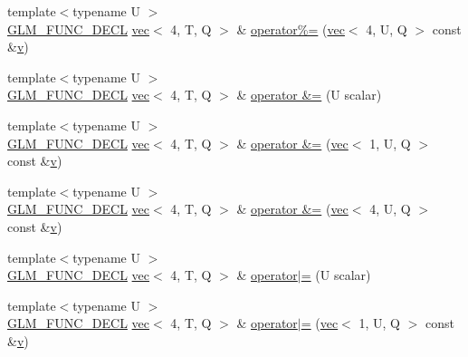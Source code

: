 \begin{DoxyCompactItemize}
\item 
{\footnotesize template$<$typename U $>$ }\\\hyperlink{setup_8hpp_ab2d052de21a70539923e9bcbf6e83a51}{G\+L\+M\+\_\+\+F\+U\+N\+C\+\_\+\+D\+E\+CL} \hyperlink{structglm_1_1vec}{vec}$<$ 4, T, Q $>$ \& \hyperlink{structglm_1_1vec_3_014_00_01_t_00_01_q_01_4_a10da98a89881a5135b526ceaa75c6f13}{operator\%=} (\hyperlink{structglm_1_1vec}{vec}$<$ 4, U, Q $>$ const \&\hyperlink{_s_d_l__opengl_8h_a10a82eabcb59d2fcd74acee063775f90}{v})
\item 
{\footnotesize template$<$typename U $>$ }\\\hyperlink{setup_8hpp_ab2d052de21a70539923e9bcbf6e83a51}{G\+L\+M\+\_\+\+F\+U\+N\+C\+\_\+\+D\+E\+CL} \hyperlink{structglm_1_1vec}{vec}$<$ 4, T, Q $>$ \& \hyperlink{structglm_1_1vec_3_014_00_01_t_00_01_q_01_4_a16aab24048ca1e0f7508c80daad228ca}{operator \&=} (U scalar)
\item 
{\footnotesize template$<$typename U $>$ }\\\hyperlink{setup_8hpp_ab2d052de21a70539923e9bcbf6e83a51}{G\+L\+M\+\_\+\+F\+U\+N\+C\+\_\+\+D\+E\+CL} \hyperlink{structglm_1_1vec}{vec}$<$ 4, T, Q $>$ \& \hyperlink{structglm_1_1vec_3_014_00_01_t_00_01_q_01_4_a0367ad867801ac2e7112bfe8a95e996e}{operator \&=} (\hyperlink{structglm_1_1vec}{vec}$<$ 1, U, Q $>$ const \&\hyperlink{_s_d_l__opengl_8h_a10a82eabcb59d2fcd74acee063775f90}{v})
\item 
{\footnotesize template$<$typename U $>$ }\\\hyperlink{setup_8hpp_ab2d052de21a70539923e9bcbf6e83a51}{G\+L\+M\+\_\+\+F\+U\+N\+C\+\_\+\+D\+E\+CL} \hyperlink{structglm_1_1vec}{vec}$<$ 4, T, Q $>$ \& \hyperlink{structglm_1_1vec_3_014_00_01_t_00_01_q_01_4_adc70eea7b85cb2849ff51803b85f1605}{operator \&=} (\hyperlink{structglm_1_1vec}{vec}$<$ 4, U, Q $>$ const \&\hyperlink{_s_d_l__opengl_8h_a10a82eabcb59d2fcd74acee063775f90}{v})
\item 
{\footnotesize template$<$typename U $>$ }\\\hyperlink{setup_8hpp_ab2d052de21a70539923e9bcbf6e83a51}{G\+L\+M\+\_\+\+F\+U\+N\+C\+\_\+\+D\+E\+CL} \hyperlink{structglm_1_1vec}{vec}$<$ 4, T, Q $>$ \& \hyperlink{structglm_1_1vec_3_014_00_01_t_00_01_q_01_4_a406f2bfe72cf1f25af84f3dc84a43b27}{operator$\vert$=} (U scalar)
\item 
{\footnotesize template$<$typename U $>$ }\\\hyperlink{setup_8hpp_ab2d052de21a70539923e9bcbf6e83a51}{G\+L\+M\+\_\+\+F\+U\+N\+C\+\_\+\+D\+E\+CL} \hyperlink{structglm_1_1vec}{vec}$<$ 4, T, Q $>$ \& \hyperlink{structglm_1_1vec_3_014_00_01_t_00_01_q_01_4_a147590be4731c2b2236f56d11019498f}{operator$\vert$=} (\hyperlink{structglm_1_1vec}{vec}$<$ 1, U, Q $>$ const \&\hyperlink{_s_d_l__opengl_8h_a10a82eabcb59d2fcd74acee063775f90}{v})

\end{DoxyCompactItemize}
